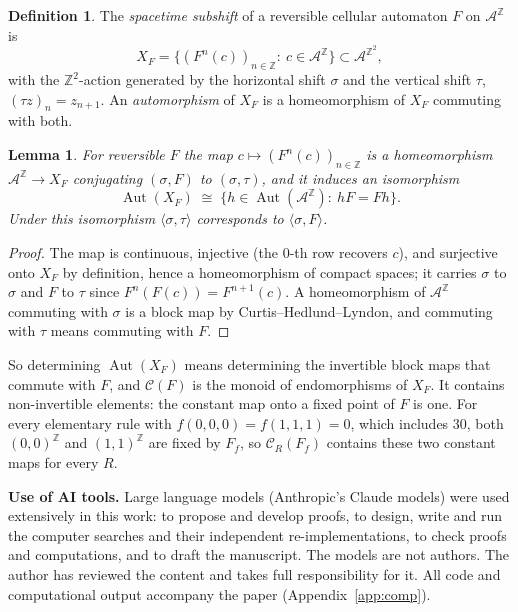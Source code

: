 \documentclass[11pt]{amsart}
\newtheorem{lemma}[theorem]{Lemma}
\theoremstyle{definition}
\newtheorem{definition}[theorem]{Definition}
\theoremstyle{remark}
\newcommand{\Z}{\mathbb{Z}}
\newcommand{\A}{\mathcal{A}}
\newcommand{\Aut}{\operatorname{Aut}}
\newcommand{\Cent}{\mathcal{C}}
\newcommand{\sh}{\sigma}
\begin{document}
\begin{definition}
The \emph{spacetime subshift} of a reversible cellular automaton $F$ on $\A^{\Z}$ is
\[
X_F=\bigl\{(F^n(c))_{n\in\Z}:\ c\in\A^{\Z}\bigr\}\subset\A^{\Z^2},
\]
with the $\Z^2$-action generated by the horizontal shift $\sh$ and the vertical shift $\tau$, $(\tau z)_{n}=z_{n+1}$. An \emph{automorphism} of $X_F$ is a homeomorphism of $X_F$ commuting with both.
\end{definition}

\begin{lemma}\label{lem:spacetime}
For reversible $F$ the map $c\mapsto(F^n(c))_{n\in\Z}$ is a homeomorphism $\A^{\Z}\to X_F$ conjugating $(\sh,F)$ to $(\sh,\tau)$, and it induces an isomorphism
\[
\Aut(X_F)\;\cong\;\{h\in\Aut(\A^{\Z}):\ hF=Fh\}.
\]
Under this isomorphism $\langle\sh,\tau\rangle$ corresponds to $\langle\sh,F\rangle$.
\end{lemma}

\begin{proof}
The map is continuous, injective (the $0$-th row recovers $c$), and surjective onto $X_F$ by definition, hence a homeomorphism of compact spaces; it carries $\sh$ to $\sh$ and $F$ to $\tau$ since $F^{n}(F(c))=F^{n+1}(c)$. A homeomorphism of $\A^{\Z}$ commuting with $\sh$ is a block map by Curtis--Hedlund--Lyndon, and commuting with $\tau$ means commuting with $F$.
\end{proof}

So determining $\Aut(X_F)$ means determining the invertible block maps that commute with $F$, and $\Cent(F)$ is the monoid of endomorphisms of $X_F$. It contains non-invertible elements: the constant map onto a fixed point of $F$ is one. For every elementary rule with $f(0,0,0)=f(1,1,1)=0$, which includes $30$, both $(0,0)^{\Z}$ and $(1,1)^{\Z}$ are fixed by $F_f$, so $\Cent_R(F_f)$ contains these two constant maps for every $R$.










\appendix



\medskip
\noindent\textbf{Use of AI tools.} Large language models (Anthropic's Claude models) were used extensively in this work: to propose and develop proofs, to design, write and run the computer searches and their independent re-implementations, to check proofs and computations, and to draft the manuscript. The models are not authors. The author has reviewed the content and takes full responsibility for it. All code and computational output accompany the paper (Appendix~\ref{app:comp}).
\end{document}
